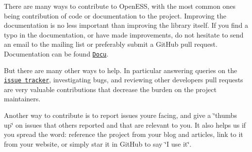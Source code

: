 There are many ways to contribute to Open\+E\+SS, with the most common ones being contribution of code or documentation to the project. Improving the documentation is no less important than improving the library itself. If you find a typo in the documentation, or have made improvements, do not hesitate to send an email to the mailing list or preferably submit a Git\+Hub pull request. Documentation can be found \href{https://roseleblood.github.io/openess/html/d3/dcc/md__r_e_a_d_m_e.html}{\tt Docu}.

But there are many other ways to help. In particular answering queries on the \href{https://github.com/RoseLeBlood/openess/issues}{\tt issue tracker}, investigating bugs, and reviewing other developers\textquotesingle{} pull requests are very valuable contributions that decrease the burden on the project maintainers.

Another way to contribute is to report issues you\textquotesingle{}re facing, and give a \char`\"{}thumbs
up\char`\"{} on issues that others reported and that are relevant to you. It also helps us if you spread the word\+: reference the project from your blog and articles, link to it from your website, or simply star it in Git\+Hub to say \char`\"{}\+I use it\char`\"{}. 